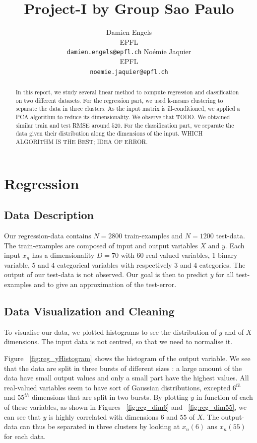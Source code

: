 \documentclass{article} %
\title{Project-I by Group Sao Paulo}
\author{
Damien Engels\\
EPFL \\
\texttt{damien.engels@epfl.ch} \And No\'emie Jaquier\\
EPFL \\
\texttt{noemie.jaquier@epfl.ch} \\
}
\begin{document}
\maketitle

\begin{abstract}
In this report, we study several linear method to compute regression and classification on two different datasets. For the regression part, we used k-means clustering to separate the data in three clusters. As the input matrix is ill-conditioned, we applied a PCA algorithm to reduce its dimensionality. We observe that TODO. We obtained similar train and test RMSE around $520$. For the classification part, we separate the data given their distribution along the dimensions of the input. WHICH ALGORITHM IS THE BEST; IDEA OF ERROR.
\end{abstract}

\section{Regression}
\subsection{Data Description}
Our regression-data contains $N=2800$ train-examples and $N=1200$ test-data. The
train-examples are composed of input and output variables $X$ and $y$. Each
input $x_n$ has a dimensionality $D=70$ with 60 real-valued variables, 1 binary
variable, 5 and 4 categorical variables with respectively 3 and 4 categories.
The output of our test-data is not observed. Our goal is then to predict $y$ for
all test-examples and to give an approximation of the test-error.

\subsection{Data Visualization and Cleaning}
To visualise our data, we plotted histograms to see the distribution of $y$ and
of $X$ dimensions. The input data is not centred, so that we need to normalise
it. 

Figure ~\ref{fig:reg_yHistogram} shows the histogram of the output variable. We
see that the data are split in three bursts of different sizes : a large amount
of the data have small output values and only a small part have the highest
values. All real-valued variables seem to have sort of Gaussian distributions,
excepted $6^{th}$ and $55^{th}$ dimensions that are split in two bursts. By
plotting $y$ in function of each of these variables, as shown in Figures
~\ref{fig:reg_dim6} and ~\ref{fig:reg_dim55}, we can see that $y$ is highly
correlated with dimensions $6$ and $55$ of $X$. The output-data can thus be
separated in three clusters by looking at $x_n(6)$ ans $x_n(55)$ for each data.
\end{document}
